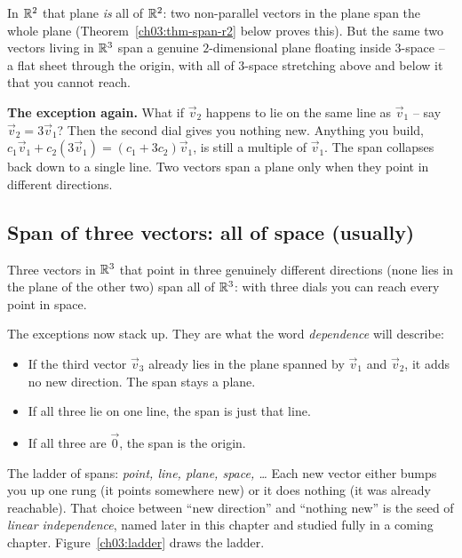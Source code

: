 In $\mathbb{R}^2$ that plane \emph{is} all of $\mathbb{R}^2$: two non-parallel vectors in the plane span the whole plane (Theorem~\ref{ch03:thm-span-r2} below proves this). But the same two vectors living in $\mathbb{R}^3$ span a genuine $2$-dimensional plane floating inside $3$-space -- a flat sheet through the origin, with all of $3$-space stretching above and below it that you cannot reach.

\textbf{The exception again.} What if $\vec{v}_2$ happens to lie on the same line as $\vec{v}_1$ -- say $\vec{v}_2 = 3\vec{v}_1$? Then the second dial gives you nothing new. Anything you build, $c_1\vec{v}_1 + c_2(3\vec{v}_1) = (c_1 + 3c_2)\vec{v}_1$, is still a multiple of $\vec{v}_1$. The span collapses back down to a single line. Two vectors span a plane only when they point in different directions.

\subsection{Span of three vectors: all of space (usually)}

Three vectors in $\mathbb{R}^3$ that point in three genuinely different directions (none lies in the plane of the other two) span all of $\mathbb{R}^3$: with three dials you can reach every point in space.

The exceptions now stack up. They are what the word \emph{dependence} will describe:

\begin{itemize}
  \item If the third vector $\vec{v}_3$ already lies in the plane spanned by $\vec{v}_1$ and $\vec{v}_2$, it adds no new direction. The span stays a plane.
  \item If all three lie on one line, the span is just that line.
  \item If all three are $\vec{0}$, the span is the origin.
\end{itemize}

\begin{focusbox}
The ladder of spans: \emph{point, line, plane, space, \dots} Each new vector either bumps you up one rung (it points somewhere new) or it does nothing (it was already reachable). That choice between ``new direction'' and ``nothing new'' is the seed of \emph{linear independence}, named later in this chapter and studied fully in a coming chapter. Figure~\ref{ch03:ladder} draws the ladder.
\end{focusbox}

